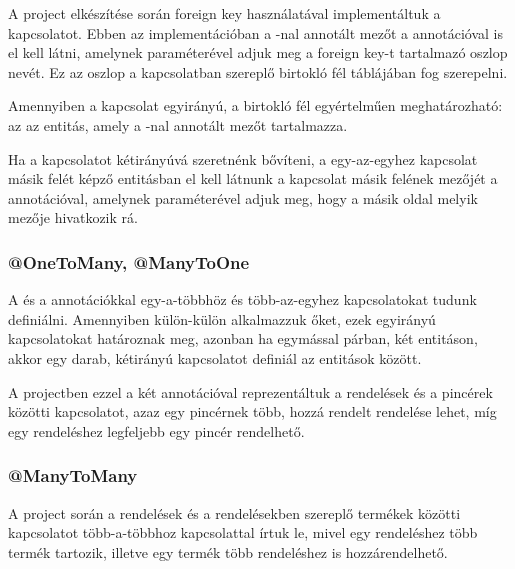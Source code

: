 A project elkészítése során foreign key használatával implementáltuk a kapcsolatot. Ebben az implementációban a -nal annotált mezőt a  annotációval is el kell látni, amelynek  paraméterével adjuk meg a foreign key-t tartalmazó oszlop nevét. Ez az oszlop a kapcsolatban szereplő birtokló fél táblájában fog szerepelni. \par

Amennyiben a kapcsolat egyirányú, a birtokló fél egyértelműen meghatározható: az az entitás, amely a -nal annotált mezőt tartalmazza.\par

Ha a kapcsolatot kétirányúvá szeretnénk bővíteni, a egy-az-egyhez kapcsolat másik felét képző entitásban el kell látnunk a kapcsolat másik felének mezőjét a  annotációval, amelynek  paraméterével adjuk meg, hogy a másik oldal melyik mezője hivatkozik rá. \par


\subsubsection{@OneToMany, @ManyToOne}
A  és a  annotációkkal egy-a-többhöz és több-az-egyhez kapcsolatokat tudunk definiálni. Amennyiben külön-külön alkalmazzuk őket, ezek egyirányú kapcsolatokat határoznak meg, azonban ha egymással párban, két entitáson, akkor egy darab, kétirányú kapcsolatot definiál az entitások között. \par

A projectben ezzel a két annotációval reprezentáltuk a rendelések és a pincérek közötti kapcsolatot, azaz egy pincérnek több, hozzá rendelt rendelése lehet, míg egy rendeléshez legfeljebb egy pincér rendelhető.


\subsubsection{@ManyToMany}

A project során a rendelések és a rendelésekben szereplő termékek közötti kapcsolatot több-a-többhoz kapcsolattal írtuk le, mivel egy rendeléshez több termék tartozik, illetve egy termék több rendeléshez is hozzárendelhető. \par

